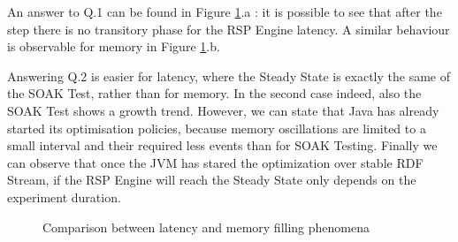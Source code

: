 An answer to Q.1 can be found in Figure \ref{fig:level3-step}.a : it is possible to see that after the step there is no transitory phase for the RSP Engine latency. A similar behaviour is observable for memory in Figure \ref{fig:level3-step}.b. 

Answering Q.2 is easier for latency, where the Steady State is exactly the same of the SOAK Test, rather than for memory. In the second case indeed, also the SOAK Test shows a growth trend. However, we can state that Java has already started its optimisation policies, because memory oscillations are limited to a small interval and their required less events than for SOAK Testing. Finally we can observe that once the JVM has stared the optimization over stable RDF Stream, if the RSP Engine will reach the Steady State only depends on the experiment duration.


\begin{figure}[tbh]
  \centering
	\caption[\textsc{Analyser} Investigation Stack - Level 3 - Inter Experiment Comparison - Step Response Test]{Comparison between latency and memory filling phenomena} 
  	\label{fig:level3-step}
\end{figure}